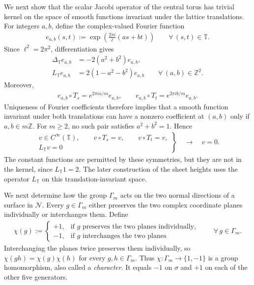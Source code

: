 \documentclass[a4paper,11pt,oneside,reqno]{amsart}
\numberwithin{equation}{section}
\theoremstyle{definition}
\begin{document}
We next show that the scalar Jacobi operator of the central
torus has trivial kernel on the space of smooth functions
invariant under the lattice translations.
For integers $a,b$, define the complex-valued Fourier
function
%
\begin{align*}
    e_{a,b}(s,t):=
    \exp\left(\frac{2\pi i}{\ell}(as+bt)\right)
    \qquad\forall\,(s,t)\in\mathbb T.
\end{align*}
%
Since $\ell^2=2\pi^2$, differentiation gives
%
\begin{align*}
    \Delta_{\mathbb T}e_{a,b}
    &=-2(a^2+b^2)e_{a,b},\\
    L_{\mathbb T}e_{a,b}
    &=2(1-a^2-b^2)e_{a,b}
    \qquad\forall\,(a,b)\in\mathbb Z^2.
\end{align*}
%
Moreover,
%
\begin{align*}
    e_{a,b}\circ T_s=e^{2\pi ia/m}e_{a,b},
    \qquad
    e_{a,b}\circ T_t=e^{2\pi ib/m}e_{a,b}.
\end{align*}
%
Uniqueness of Fourier coefficients therefore implies that
a smooth function invariant under both translations can
have a nonzero coefficient at $(a,b)$ only if $a,b\in m\mathbb Z$.
For $m\geq2$, no such pair satisfies $a^2+b^2=1$. Hence
%
\begin{align}
    \label{eq:s4-translation-kernel}
    \left.
    \begin{gathered}
        v\in C^\infty(\mathbb T),\qquad
        v\circ T_s=v,\qquad v\circ T_t=v,\\
        L_{\mathbb T}v=0
    \end{gathered}
    \right\}
    \quad\rightarrow\quad v=0.
\end{align}
%
The constant functions are permitted by these symmetries,
but they are not in the kernel, since
$L_{\mathbb T}1=2$. The later construction of the sheet
heights uses the operator $L_{\mathbb T}$ on this
translation-invariant space.

We next determine how the group $\Gamma_m$ acts on the two normal
directions of a surface in $\mathcal N$.
Every $g\in\Gamma_m$ either preserves the two complex
coordinate planes individually or interchanges them. Define
%
\begin{align*}
    \chi(g):=
    \begin{cases}
        +1,&\text{if $g$ preserves the two planes individually},\\
        -1,&\text{if $g$ interchanges the two planes}
    \end{cases}
    \qquad\forall\,g\in\Gamma_m.
\end{align*}
%
Interchanging the planes twice preserves them individually,
so $\chi(gh)=\chi(g)\chi(h)$ for every $g,h\in\Gamma_m$.
Thus $\chi:\Gamma_m\to\{1,-1\}$ is a group homomorphism,
also called a \textit{character}. It equals $-1$ on $\sigma$ and
$+1$ on each of the other five generators.
\end{document}
